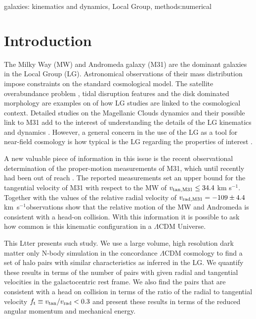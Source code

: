\documentclass{emulateapj}
\newcommand{\kms}{\,km~s$^{-1}$}
\begin{document}
\begin{keywords}
{galaxies: kinematics and dynamics, Local Group, methods:numerical}
\end{keywords}

\section{Introduction}

The Milky Way (MW) and Andromeda galaxy (M31) are the dominant galaxies in the Local Group (LG). Astronomical observations of their mass distribution impose constraints on the standard cosmological model. The satellite overabundance problem \citep{Klypin99,Moore99}, tidal disruption features \citep{pandas09} and the disk dominated morphology \citep{Kazantzidis2008} are examples on of how LG studies are linked to the cosmological context. Detailed studies on the Magellanic Clouds dynamics and their possible link to M31 add to the interest of understanding the details of the LG kinematics and dynamics \citep{Besla2007,Tollerud2011,Knebe2011,Fouquet2012,Teyssier2012}. However, a general concern in the use of the LG as a tool for near-field cosmology \citep{Freeman2002,Peebles2010} is how typical is the LG regarding the properties of interest \citep{Busha2011,Liu2011,ForeroRomero2011,Purcell2012}. 

A new valuable piece of information in this issue is the recent observational determination of the proper-motion measurements of M31, which until recently had been out of reach \citep{vanderMarel12}. 
The reported measurements set an upper bound for the tangential velocity of M31 with respect to the MW of $v_{\rm tan,M31}\leq 34.4$ km s$^{-1}$. Together with the values of the relative radial velocity of $v_{\rm rad,M31}=-109\pm 4.4$ \kms observations show that the relative motion of the MW and Andromeda is consistent with a head-on collision. With this information it is possible to ask how common is this kinematic configuration in a $\Lambda$CDM Universe.

This Ltter presents such study. We use a large volume, high resolution dark matter only N-body simulation in the concordance $\Lambda$CDM cosmology to find a set of halo pairs with similar 
characteristics %
as inferred in the LG. We quantify these results in terms of the number of pairs with given radial and tangential velocities in the galactocentric rest frame. We also find the pairs that are consistent with a head on collision in terms of the ratio of the radial to tangential velocity $f_{\rm t}\equiv v_{\rm tan}/v_{\rm rad}<0.3$ and present these results in terms of the reduced angular momentum and mechanical energy.
\end{document}

